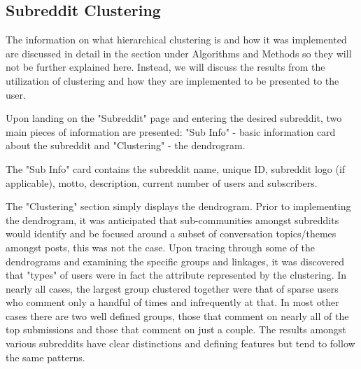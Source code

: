 \documentclass[msc,oneside]{ubcthesis}%
\begin{document}
\subsection{Subreddit Clustering}
The information on what hierarchical clustering is and how it was implemented are discussed in detail in the section under Algorithms and Methods so they will not be further explained here. Instead, we will discuss the results from the utilization of clustering and how they are implemented to be presented to the user.
\par
Upon landing on the "Subreddit" page and entering the desired subreddit, two main pieces of information are presented: "Sub Info" - basic information card about the subreddit and "Clustering" - the dendrogram.
\par
The "Sub Info" card contains the subreddit name, unique ID, subreddit logo (if applicable), motto, description, current number of users and subscribers.
\par
The "Clustering" section simply displays the dendrogram. Prior to implementing the dendrogram, it was anticipated that sub-communities amongst subreddits would identify and be focused around a subset of conversation topics/themes amongst posts, this was not the case. Upon tracing through some of the dendrograms and examining the specific groups and linkages, it was discovered that "types" of users were in fact the attribute represented by the clustering. In nearly all cases, the largest group clustered together were that of sparse users who comment only a handful of times and infrequently at that. In most other cases there are two well defined groups, those that comment on nearly all of the top submissions and those that comment on just a couple. The results amongst various subreddits have clear distinctions and defining features but tend to follow the same patterns.
\end{document}
